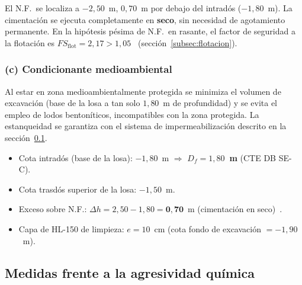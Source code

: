 El N.F.\ se localiza a $-2{,}50$~m, $0{,}70$~m por debajo del intradós
($-1{,}80$~m). La cimentación se ejecuta completamente en \textbf{seco},
sin necesidad de agotamiento permanente.
En la hipótesis pésima de N.F.\ en rasante, el factor de seguridad a la
flotación es $FS_\text{flot}=2{,}17>1{,}05$~\checkmark
(sección~\ref{subsec:flotacion}).

\subsubsection*{(c) Condicionante medioambiental}

Al estar en zona medioambientalmente protegida se minimiza el volumen de
excavación (base de la losa a tan solo $1{,}80$~m de profundidad) y se
evita el empleo de lodos bentoníticos, incompatibles con la zona protegida.
La estanqueidad se garantiza con el sistema de impermeabilización descrito
en la sección~\ref{subsec:impermeabilizacion_arqueta}.

\begin{supuestobox}
  \begin{itemize}
    \item Cota intradós (base de la losa): $-1{,}80$~m $\Rightarrow$
          \textbf{$D_f=1{,}80$~m} (CTE DB SE-C).
    \item Cota trasdós superior de la losa: $-1{,}50$~m.
    \item Exceso sobre N.F.: $\Delta h = 2{,}50-1{,}80 = \mathbf{0{,}70}$~m
          (cimentación en seco)~\checkmark.
    \item Capa de HL-150 de limpieza: $e=10$~cm
          (cota fondo de excavación $=-1{,}90$~m).
  \end{itemize}
\end{supuestobox}

\subsection{Medidas frente a la agresividad química}
\label{subsec:impermeabilizacion_arqueta}

